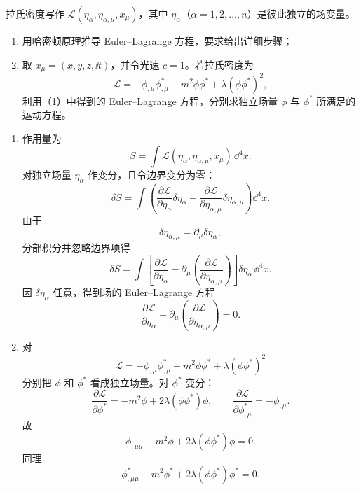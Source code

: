 \begin{question}
拉氏密度写作 $\mathcal{L}(\eta_\alpha,\eta_{\alpha,\mu},x_\mu)$，其中 $\eta_\alpha$（$\alpha=1,2,\dots,n$）是彼此独立的场变量。
\begin{enumerate}
  \item 用哈密顿原理推导 Euler--Lagrange 方程，要求给出详细步骤；
  \item 取 $x_\mu=(x,y,z,\ii t)$，并令光速 $c=1$。若拉氏密度为
  \[
    \mathcal{L}=-\phi_{,\mu}\phi^*_{,\mu}-m^2\phi\phi^*+\lambda(\phi\phi^*)^2,
  \]
  利用（1）中得到的 Euler--Lagrange 方程，分别求独立场量 $\phi$ 与 $\phi^*$ 所满足的运动方程。
\end{enumerate}

\begin{solution}
\begin{enumerate}
  \item 作用量为
  \[
    S=\int \mathcal L(\eta_\alpha,\eta_{\alpha,\mu},x_\mu)\,\dd^4x.
  \]
  对独立场量 $\eta_\alpha$ 作变分，且令边界变分为零：
  \[
    \delta S=\int\left(
    \frac{\partial\mathcal L}{\partial\eta_\alpha}\delta\eta_\alpha
    +\frac{\partial\mathcal L}{\partial\eta_{\alpha,\mu}}
    \delta\eta_{\alpha,\mu}
    \right)\dd^4x.
  \]
  由于
  \[
    \delta\eta_{\alpha,\mu}=\partial_\mu\delta\eta_\alpha,
  \]
  分部积分并忽略边界项得
  \[
    \delta S=\int\left[
    \frac{\partial\mathcal L}{\partial\eta_\alpha}
    -\partial_\mu\left(
    \frac{\partial\mathcal L}{\partial\eta_{\alpha,\mu}}
    \right)
    \right]\delta\eta_\alpha\,\dd^4x.
  \]
  因 $\delta\eta_\alpha$ 任意，得到场的 Euler--Lagrange 方程
  \[
    \boxed{\frac{\partial\mathcal L}{\partial\eta_\alpha}
    -\partial_\mu\left(
    \frac{\partial\mathcal L}{\partial\eta_{\alpha,\mu}}
    \right)=0}.
  \]
  \item 对
  \[
    \mathcal{L}=-\phi_{,\mu}\phi^*_{,\mu}-m^2\phi\phi^*+
    \lambda(\phi\phi^*)^2
  \]
  分别把 $\phi$ 和 $\phi^*$ 看成独立场量。对 $\phi^*$ 变分：
  \[
    \frac{\partial\mathcal L}{\partial\phi^*}
    =-m^2\phi+2\lambda(\phi\phi^*)\phi,
    \qquad
    \frac{\partial\mathcal L}{\partial\phi^*_{,\mu}}=-\phi_{,\mu}.
  \]
  故
  \[
    \boxed{\phi_{,\mu\mu}-m^2\phi+2\lambda(\phi\phi^*)\phi=0}.
  \]
  同理
  \[
    \boxed{\phi^*_{,\mu\mu}-m^2\phi^*+2\lambda(\phi\phi^*)\phi^*=0}.
  \]
\end{enumerate}
\end{solution}
\end{question}

